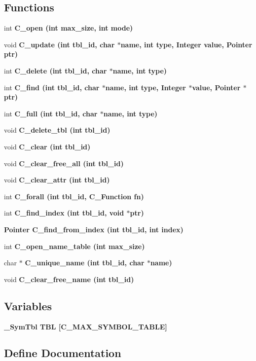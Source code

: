 \subsection*{Functions}
\begin{CompactItemize}
\item 
int \bf{C\_\-open} (int max\_\-size, int \bf{mode})
\item 
void \bf{C\_\-update} (int tbl\_\-id, char $\ast$\bf{name}, int type, \bf{Integer} value, \bf{Pointer} ptr)
\item 
int \bf{C\_\-delete} (int tbl\_\-id, char $\ast$\bf{name}, int type)
\item 
int \bf{C\_\-find} (int tbl\_\-id, char $\ast$\bf{name}, int type, \bf{Integer} $\ast$value, \bf{Pointer} $\ast$ptr)
\item 
int \bf{C\_\-full} (int tbl\_\-id, char $\ast$\bf{name}, int type)
\item 
void \bf{C\_\-delete\_\-tbl} (int tbl\_\-id)
\item 
void \bf{C\_\-clear} (int tbl\_\-id)
\item 
void \bf{C\_\-clear\_\-free\_\-all} (int tbl\_\-id)
\item 
void \bf{C\_\-clear\_\-attr} (int tbl\_\-id)
\item 
int \bf{C\_\-forall} (int tbl\_\-id, \bf{C\_\-Function} fn)
\item 
int \bf{C\_\-find\_\-index} (int tbl\_\-id, void $\ast$ptr)
\item 
\bf{Pointer} \bf{C\_\-find\_\-from\_\-index} (int tbl\_\-id, int index)
\item 
int \bf{C\_\-open\_\-name\_\-table} (int max\_\-size)
\item 
char $\ast$ \bf{C\_\-unique\_\-name} (int tbl\_\-id, char $\ast$\bf{name})
\item 
void \bf{C\_\-clear\_\-free\_\-name} (int tbl\_\-id)
\end{CompactItemize}
\subsection*{Variables}
\begin{CompactItemize}
\item 
\bf{\_\-Sym\-Tbl} \bf{TBL} [C\_\-MAX\_\-SYMBOL\_\-TABLE]
\end{CompactItemize}


\subsection{Define Documentation}
